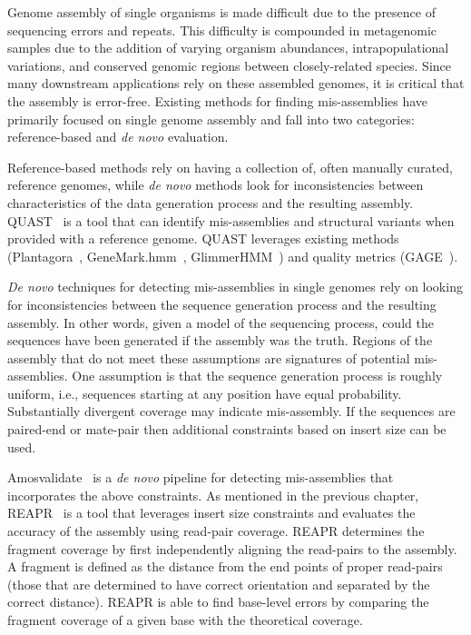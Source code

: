 \documentclass{bioinfo}
\begin{document}
Genome assembly of single organisms is made difficult due to the presence of sequencing errors and repeats.
This difficulty is compounded in metagenomic samples due to the addition of varying organism abundances, intrapopulational variations, and conserved genomic regions between closely-related species.
Since many downstream applications rely on these assembled genomes, it is critical that the assembly is error-free.
Existing methods for finding mis-assemblies have primarily focused on single genome assembly and fall into two categories: reference-based and \emph{de novo} evaluation.

Reference-based methods rely on having a collection of, often manually curated, reference genomes, while \emph{de novo} methods look for inconsistencies between characteristics of the data generation process and the resulting assembly.
QUAST~\citep{gurevich2013quast} is a tool that can identify mis-assemblies and structural variants when provided with a reference genome.
QUAST leverages existing methods (Plantagora~\citep{barthelson2011plantagora},
GeneMark.hmm~\citep{lukashin1998genemark}, GlimmerHMM~\citep{majoros2004tigrscan}) and quality metrics (GAGE~\citep{salzberg2011gage}).

\emph{De novo} techniques for detecting mis-assemblies in single genomes rely on looking for inconsistencies between the sequence generation process and the resulting assembly.
In other words, given a model of the sequencing process, could the sequences have been generated if the assembly was the truth.
Regions of the assembly that do not meet these assumptions are signatures of potential mis-assemblies.
One assumption is that the sequence generation process is roughly uniform, i.e., sequences starting at any position have equal probability.
Substantially divergent coverage may indicate mis-assembly.
If the sequences are paired-end or mate-pair then additional constraints based on insert size can be used.

Amosvalidate~\citep{amosvalidate2008} is a \emph{de novo} pipeline for detecting mis-assemblies that incorporates the above constraints.
As mentioned in the previous chapter, REAPR~\citep{hunt2013reapr} is a tool that leverages insert size constraints and evaluates the accuracy of the assembly using read-pair coverage.
REAPR determines the fragment coverage by first independently aligning the read-pairs to the assembly.
A fragment is defined as the distance from the end points of proper read-pairs (those that are determined to have correct orientation and separated by the correct distance).
REAPR is able to find base-level errors by comparing the fragment coverage of a given base with the theoretical coverage.
\end{document}
